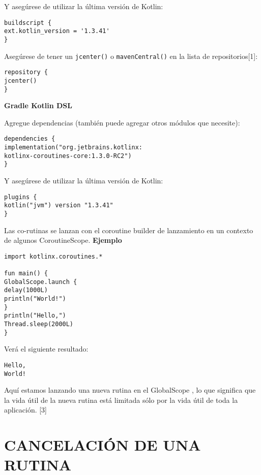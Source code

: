 \documentclass[twocolumn,10pt,abstract=on]{asme2ej}
\begin{document}
Y asegúrese de utilizar la última versión de Kotlin:

\begin{verbatim}
buildscript {
ext.kotlin_version = '1.3.41'
}
\end{verbatim}

Asegúrese de tener un  \verb+jcenter()+ o   \verb+mavenCentral()+ en la lista de repositorios[1]:

\begin{verbatim}
repository {
jcenter()
}
\end{verbatim}

\smallbreak
\begin{flushleft}
\textbf{%
	\large {Gradle Kotlin DSL}}
\end{flushleft}

Agregue dependencias (también puede agregar otros módulos que necesite):

\begin{verbatim}
dependencies {
implementation("org.jetbrains.kotlinx:
kotlinx-coroutines-core:1.3.0-RC2")
}
\end{verbatim}

Y asegúrese de utilizar la última versión de Kotlin:

\begin{verbatim}
plugins {
kotlin("jvm") version "1.3.41"
}
\end{verbatim}

	Las co-rutinas se lanzan con el coroutine builder de lanzamiento en un contexto de algunos  CoroutineScope.\linebreak
\smallbreak
\textbf{%
	\large {Ejemplo}}

\begin{verbatim}
import kotlinx.coroutines.*

fun main() {
GlobalScope.launch { 
delay(1000L)
println("World!")
}
println("Hello,")
Thread.sleep(2000L)
}
\end{verbatim}

Verá el siguiente resultado:

\begin{verbatim}
Hello,
World!
\end{verbatim}

Aquí estamos lanzando una nueva rutina en el GlobalScope , lo que significa que la vida útil de la nueva rutina está limitada sólo por la vida útil de toda la aplicación. [3]

\section{CANCELACIÓN DE UNA RUTINA}
\end{document}
